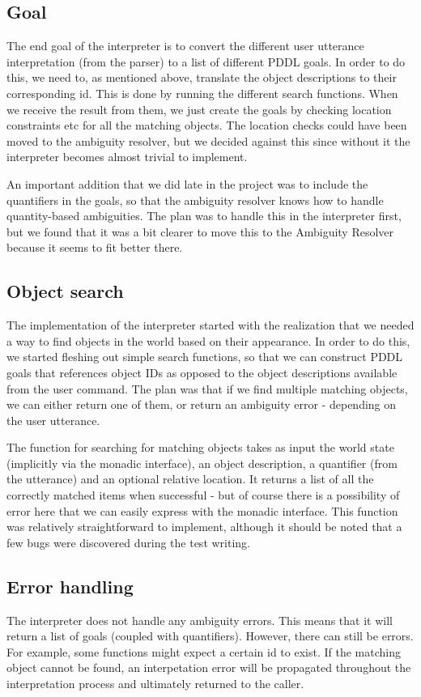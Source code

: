 \subsection*{Goal}
The end goal of the interpreter is to convert the different user utterance interpretation (from the parser) to a list of different PDDL goals.
In order to do this, we need to, as mentioned above, translate the object descriptions to their corresponding id.
This is done by running the different search functions.
When we receive the result from them, we just create the goals by checking location constraints etc for all the matching objects. The location checks could have been moved to the ambiguity resolver, but we decided against this since without it the interpreter becomes almost trivial to implement.

An important addition that we did late in the project was to include the quantifiers in the goals, so that the ambiguity resolver knows how to handle quantity-based ambiguities. The plan was to handle this in the interpreter first, but we found that it was a bit clearer to move this to the Ambiguity Resolver because it seems to fit better there.

\subsection*{Object search}
The implementation of the interpreter started with the realization that we needed a way to find objects in the world based on their appearance.
In order to do this, we started fleshing out simple search functions, so that we can construct PDDL goals that references object IDs as opposed to the object descriptions available from the user command.
The plan was that if we find multiple matching objects, we can either return one of them, or return an ambiguity error - depending on the user utterance.

The function for searching for matching objects takes as input the world state (implicitly via the monadic interface), an object description, a quantifier (from the utterance) and an optional relative location.
It returns a list of all the correctly matched items when successful - but of course there is a possibility of error here that we can easily express with the monadic interface.
This function was relatively straightforward to implement, although it should be noted that a few bugs were discovered during the test writing.

\subsection*{Error handling}
The interpreter does not handle any ambiguity errors.
This means that it will return a list of goals (coupled with quantifiers).
However, there can still be errors. For example, some functions might expect a certain id to exist.
If the matching object cannot be found, an interpetation error will be propagated throughout the interpretation process and ultimately returned to the caller.
